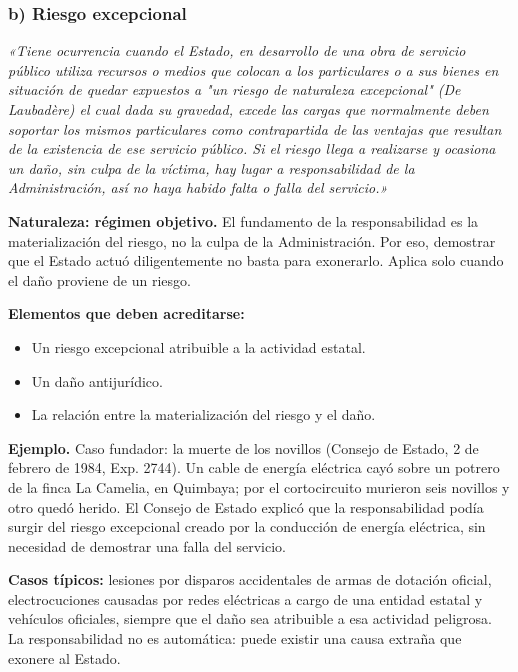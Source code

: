 \subsubsection{b) Riesgo excepcional}
\begin{cita}
\textit{«Tiene ocurrencia cuando el Estado, en desarrollo de una obra de servicio público utiliza recursos o medios que colocan a los particulares o a sus bienes en situación de quedar expuestos a "un riesgo de naturaleza excepcional" (De Laubadère) el cual dada su gravedad, excede las cargas que normalmente deben soportar los mismos particulares como contrapartida de las ventajas que resultan de la existencia de ese servicio público. Si el riesgo llega a realizarse y ocasiona un daño, sin culpa de la víctima, hay lugar a responsabilidad de la Administración, así no haya habido falta o falla del servicio.»}
\end{cita}
\textbf{Naturaleza: régimen objetivo.} El fundamento de la responsabilidad es la materialización del riesgo, no la culpa de la Administración. Por eso, demostrar que el Estado actuó diligentemente no basta para exonerarlo. Aplica solo cuando el daño proviene de un riesgo.

\textbf{Elementos que deben acreditarse:}

\begin{itemize}
\item Un riesgo excepcional atribuible a la actividad estatal.
\item Un daño antijurídico.
\item La relación entre la materialización del riesgo y el daño.
\end{itemize}
\begin{ejemplo}
\textcolor[HTML]{4F6228}{\textbf{Ejemplo. }}Caso fundador: la muerte de los novillos (Consejo de Estado, 2 de febrero de 1984, Exp. 2744). Un cable de energía eléctrica cayó sobre un potrero de la finca La Camelia, en Quimbaya; por el cortocircuito murieron seis novillos y otro quedó herido. El Consejo de Estado explicó que la responsabilidad podía surgir del riesgo excepcional creado por la conducción de energía eléctrica, sin necesidad de demostrar una falla del servicio.
\end{ejemplo}
\textbf{Casos típicos:} lesiones por disparos accidentales de armas de dotación oficial, electrocuciones causadas por redes eléctricas a cargo de una entidad estatal y vehículos oficiales, siempre que el daño sea atribuible a esa actividad peligrosa. La responsabilidad no es automática: puede existir una causa extraña que exonere al Estado.

